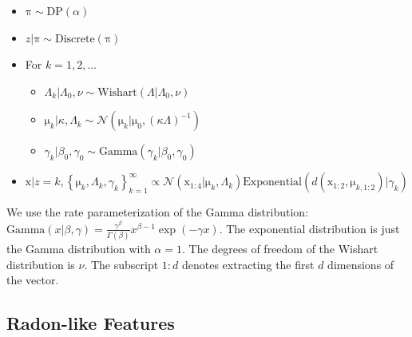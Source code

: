 \documentclass[english]{article}
\newcommand{\+}[1]{\ensuremath{\boldsymbol{\mathrm{#1}}}}
\begin{document}
\begin{itemize}
\item $\+\pi \sim \text{DP}(\alpha)$
\item $z | \+\pi \sim \text{Discrete}(\+\pi)$
\item For $k = 1, 2, \ldots$
\begin{itemize}
\item $\Lambda_k | \Lambda_0, \nu \sim \text{Wishart}(\Lambda | \Lambda_0, \nu)$
\item $\+\mu_k | \kappa , \Lambda_k \sim \mathcal{N}\left( \+\mu_k | \+\mu_0 , (\kappa\Lambda)^{-1} \right)$
\item $\gamma_k | \beta_0, \gamma_0 \sim \text{Gamma}(\gamma_k | \beta_0, \gamma_0)$
\end{itemize}
\item $\+x | z = k, \left\{ \+\mu_k , \Lambda_k, \gamma_k \right\}_{k=1}^{\infty} \propto \mathcal{N}(\+x_{1:4} | \+\mu_k , \Lambda_k) \text{Exponential}\left( d(\+x_{1:2}, \+\mu_{k,1:2}) | \gamma_k \right) \label{eq:xlike}$
\end{itemize}

We use the rate parameterization of the Gamma distribution: $\text{Gamma}(x | \beta, \gamma) = \frac{\gamma^\beta}{\Gamma(\beta)} x^{\beta-1} \exp{(-\gamma x)}$. The exponential distribution is just the Gamma distribution with $\alpha = 1$. The degrees of freedom of the Wishart distribution is $\nu$. The subscript $1:d$ denotes extracting the first $d$ dimensions of the vector.


\subsection{Radon-like Features}
\label{sec:radon}
\end{document}
